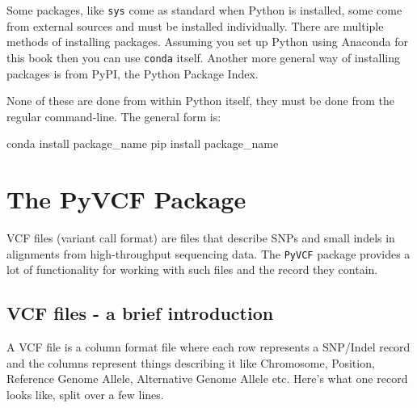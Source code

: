 \documentclass[]{book}
\newenvironment{Shaded}{\begin{snugshade}}{\end{snugshade}}
\newcommand{\ExtensionTok}[1]{#1}
\newcommand{\NormalTok}[1]{#1}
\theoremstyle{definition}
\theoremstyle{definition}
\theoremstyle{definition}
\theoremstyle{remark}
\begin{document}
Some packages, like \texttt{sys} come as standard when Python is
installed, some come from external sources and must be installed
individually. There are multiple methods of installing packages.
Assuming you set up Python using Anaconda for this book then you can use
\texttt{conda} itself. Another more general way of installing packages
is from PyPI, the Python Package Index.

None of these are done from within Python itself, they must be done from
the regular command-line. The general form is:

\begin{Shaded}
\begin{Highlighting}[]
\ExtensionTok{conda}\NormalTok{ install package_name}
\ExtensionTok{pip}\NormalTok{ install package_name}
\end{Highlighting}
\end{Shaded}

\hypertarget{the-pyvcf-package}{%
\section{The PyVCF Package}\label{the-pyvcf-package}}

VCF files (variant call format) are files that describe SNPs and small
indels in alignments from high-throughput sequencing data. The
\texttt{PyVCF} package provides a lot of functionality for working with
such files and the record they contain.

\hypertarget{vcf-files---a-brief-introduction}{%
\subsection{VCF files - a brief
introduction}\label{vcf-files---a-brief-introduction}}

A VCF file is a column format file where each row represents a SNP/Indel
record and the columns represent things describing it like Chromosome,
Position, Reference Genome Allele, Alternative Genome Allele etc. Here's
what one record looks like, split over a few lines.
\end{document}
